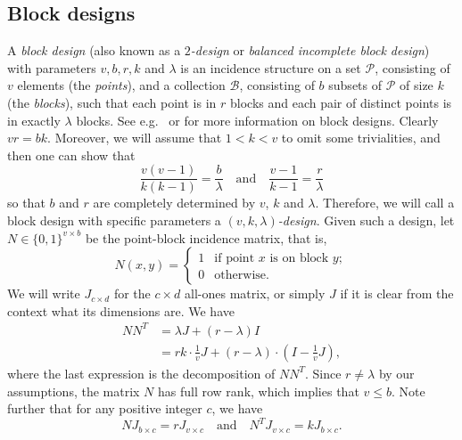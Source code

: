 \documentclass{article}
\numberwithin{equation}{section}
\begin{document}
\subsection{Block designs}
\label{subsec:blockdesigns}

A \textsl{block design} (also known as a \textsl{$2$-design} or \textsl{balanced incomplete block design}) with parameters $v,b,r,k$ and $\lambda$ is an incidence structure on a set $\mathcal{P}$, consisting of $v$ elements (the \textsl{points}), and a collection $\mathcal{B}$, consisting of $b$ subsets of $\mathcal{P}$ of size $k$ (the \textsl{blocks}), such that each point is in $r$ blocks and each pair of distinct points is in exactly $\lambda$ blocks. See e.g.\ \cite{GodRoy2001} or \cite{ColDin2007} for more information on block designs. Clearly $vr = bk$. Moreover, we will assume that $1 < k < v$ to omit some trivialities, and then one can show that
\begin{equation}
\label{eq:2design_parameter_relations}
\frac{v(v-1)}{k(k-1)} = \frac{b}{\lambda} \quad \text{and} \quad \frac{v-1}{k-1} = \frac{r}{\lambda}
\end{equation}
so that $b$ and $r$ are completely determined by $v$, $k$ and $\lambda$. Therefore, we will call a block design with specific parameters a \textsl{$(v,k,\lambda)$-design}. Given such a design, let $N \in \{0,1\}^{v \times b}$ be the point-block incidence matrix, that is,
\[
N(x,y) = \begin{cases}
1 &\text{if point $x$ is on block $y$}; \\
0 &\text{otherwise.}
\end{cases}
\]
We will write $J_{c \times d}$ for the $c \times d$ all-ones matrix, or simply $J$ if it is clear from the context what its  dimensions are. We have
\begin{align}
\label{eq:NNT_expression_JI} NN^T &= \lambda J + (r - \lambda)I  \\
\label{eq:NNT_spectral_decomposition} &= rk \cdot \frac{1}{v}J + (r-\lambda)\cdot \left(I - \frac{1}{v}J\right),
\end{align}
where the last expression is the decomposition of $NN^T$. Since $r \neq \lambda$ by our assumptions, the matrix $N$ has full row rank, which implies that $v \leq b$. Note further that for any positive integer $c$, we have
\begin{equation}
\label{eq:N_times_J}
NJ_{b \times c} = rJ_{v \times c} \quad \text{and} \quad N^T J_{v \times c} = kJ_{b\times c}.
\end{equation}
\end{document}

